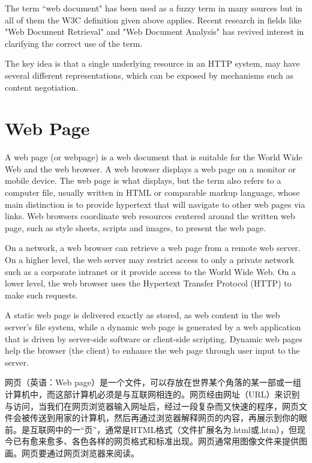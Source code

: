 The term ``web document" has been used as a fuzzy term in many sources but in all of them the W3C definition given above applies. Recent research in fields like "Web Document Retrieval" and "Web Document Analysis" has revived interest in clarifying the correct use of the term.

The key idea is that a single underlying resource in an HTTP system, may have several different representations, which can be exposed by mechanisms such as content negotiation.




\chapter{Web Page}

A web page\cite{web_page} (or webpage) is a web document that is suitable for the World Wide Web and the web browser. A web browser displays a web page on a monitor or mobile device. The web page is what displays, but the term also refers to a computer file, usually written in HTML or comparable markup language, whose main distinction is to provide hypertext that will navigate to other web pages via links. Web browsers coordinate web resources centered around the written web page, such as style sheets, scripts and images, to present the web page.

On a network, a web browser can retrieve a web page from a remote web server. On a higher level, the web server may restrict access to only a private network such as a corporate intranet or it provide access to the World Wide Web. On a lower level, the web browser uses the Hypertext Transfer Protocol (HTTP) to make such requests.

A static web page is delivered exactly as stored, as web content in the web server's file system, while a dynamic web page is generated by a web application that is driven by server-side software or client-side scripting. Dynamic web pages help the browser (the client) to enhance the web page through user input to the server.

网页（英语：Web page）是一个文件，可以存放在世界某个角落的某一部或一组计算机中，而这部计算机必须是与互联网相连的。网页经由网址（URL）来识别与访问，当我们在网页浏览器输入网址后，经过一段复杂而又快速的程序，网页文件会被传送到用家的计算机，然后再通过浏览器解释网页的内容，再展示到你的眼前。是互联网中的一“页”，通常是HTML格式（文件扩展名为.html或.htm），但现今已有愈来愈多、各色各样的网页格式和标准出现。网页通常用图像文件来提供图画。网页要通过网页浏览器来阅读。


